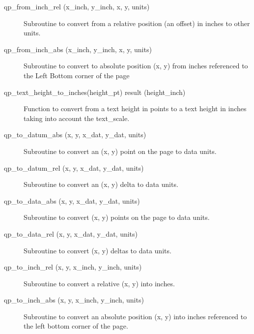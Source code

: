 \begin{description}

\item[qp\_from\_inch\_rel (x\_inch, y\_inch, x, y, units)] \Newline 
     Subroutine to convert from a relative position (an offset) in inches
     to other units.

\item[qp\_from\_inch\_abs (x\_inch, y\_inch, x, y, units)] \Newline 
     Subroutine to convert to absolute position (x, y) from inches referenced
     to the Left Bottom corner of the page

\item[qp\_text\_height\_to\_inches(height\_pt) result (height\_inch)] \Newline 
Function to convert from a text height in points to a text height in
inches taking into account the text\_scale.

\item[qp\_to\_datum\_abs (x, y, x\_dat, y\_dat, units)] \Newline 
     Subroutine to convert an (x, y) point on the page to data units.

\item[qp\_to\_datum\_rel (x, y, x\_dat, y\_dat, units)] \Newline 
     Subroutine to convert an (x, y) delta to data units.

\item[qp\_to\_data\_abs (x, y, x\_dat, y\_dat, units)] \Newline 
     Subroutine to convert (x, y) points on the page to data units.

\item[qp\_to\_data\_rel (x, y, x\_dat, y\_dat, units)] \Newline 
     Subroutine to convert (x, y) deltas to data units.

\item[qp\_to\_inch\_rel (x, y, x\_inch, y\_inch, units)] \Newline 
     Subroutine to convert a relative (x, y) into inches.

\item[qp\_to\_inch\_abs (x, y, x\_inch, y\_inch, units)] \Newline 
     Subroutine to convert an absolute position (x, y) into inches referenced
     to the left bottom corner of the page.

\end{description}

